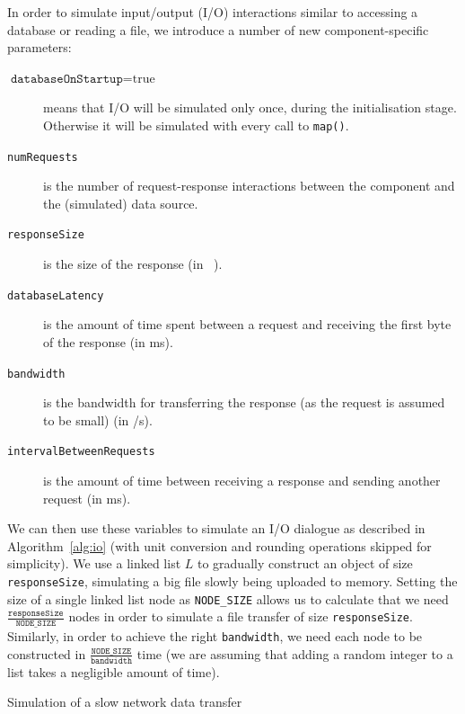 \documentclass{article}
\begin{document}
In order to simulate input/output (I/O) interactions similar to accessing a
database or reading a file, we introduce a number of new component-specific
parameters:
\begin{description}
\item[$\texttt{databaseOnStartup} = \text{true}$] means that I/O will be
  simulated only once, during the initialisation stage. Otherwise it will be
  simulated with every call to \texttt{map()}.
\item[\texttt{numRequests}] is the number of request-response interactions
  between the component and the (simulated) data source.
\item[\texttt{responseSize}] is the size of the response (in \si{\kibi\byte}).
\item[\texttt{databaseLatency}] is the amount of time spent between a request
  and receiving the first byte of the response (in \si{\milli\second}).
\item[\texttt{bandwidth}] is the bandwidth for transferring the response (as the
  request is assumed to be small) (in \si[per-mode=symbol]{\byte\per\second}).
\item[\texttt{intervalBetweenRequests}] is the amount of time between receiving
  a response and sending another request (in \si{\milli\second}).
\end{description}
We can then use these variables to simulate an I/O dialogue as described in
Algorithm~\ref{alg:io} (with unit conversion and rounding operations skipped for
simplicity). We use a linked list $L$ to gradually construct an object of size
\texttt{responseSize}, simulating a big file slowly being uploaded to memory.
Setting the size of a single linked list node as \texttt{NODE\_SIZE} allows us
to calculate that we need $\frac{\texttt{responseSize}}{\texttt{NODE\_SIZE}}$
nodes in order to simulate a file transfer of size \texttt{responseSize}.
Similarly, in order to achieve the right \texttt{bandwidth}, we need each node
to be constructed in $\frac{\texttt{NODE\_SIZE}}{\texttt{bandwidth}}$ time (we
are assuming that adding a random integer to a list takes a negligible amount of
time).

\begin{algorithm}
  \caption{Simulation of a slow network data transfer}
  \label{alg:io}
\end{algorithm}
\end{document}
